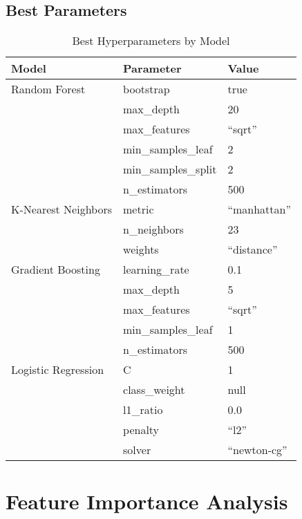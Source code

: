		\subsection{Best Parameters} \label{sec:best_params}
			\begin{table}[H]
				\centering
				\begin{tabular}{|l|l|l|}
					\hline
					\textbf{Model} & \textbf{Parameter}  & \textbf{Value} \\
					\hline
					Random Forest
					& bootstrap           & true           \\
					& max\_depth          & 20             \\
					& max\_features       & ``sqrt''       \\
					& min\_samples\_leaf  & 2              \\
					& min\_samples\_split & 2              \\
					& n\_estimators       & 500            \\
					\hline
					K-Nearest Neighbors
					& metric              & ``manhattan''  \\
					& n\_neighbors        & 23             \\
					& weights             & ``distance''   \\
					\hline
					Gradient Boosting
					& learning\_rate      & 0.1            \\
					& max\_depth          & 5              \\
					& max\_features       & ``sqrt''       \\
					& min\_samples\_leaf  & 1              \\
					& n\_estimators       & 500            \\
					\hline
					Logistic Regression
					& C                   & 1              \\
					& class\_weight       & null           \\
					& l1\_ratio           & 0.0            \\
					& penalty             & ``l2''         \\
					& solver              & ``newton-cg''  \\
					\hline
				\end{tabular}
				\caption{Best Hyperparameters by Model}
				\label{tab:model-hyperparameters}
			\end{table}


	\section{Feature Importance Analysis}

